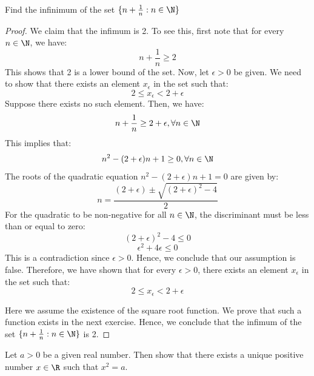 \documentclass[openany]{book}
\begin{document}
\begin{exercise}
Find the infinimum of the set $\{n + \frac{1}{n} : n \in \N\}$
\end{exercise}
\begin{proof}
We claim that the infimum is 2. To see this, first note that for every $n \in \N$, we have:
$$n + \frac{1}{n} \geq 2$$
This shows that 2 is a lower bound of the set. Now, let $\epsilon > 0$ be given. We need to show that there exists an element $x_\epsilon$ in the set such that:
$$2 \leq x_\epsilon < 2 + \epsilon$$
Suppose there exists no such element. Then, we have:
$$n + \frac{1}{n} \geq 2 + \epsilon, \forall n \in \N$$
This implies that:
$$n^2 - (2 + \epsilon)n + 1 \geq 0, \forall n \in \N$$
The roots of the quadratic equation $n^2 - (2 + \epsilon)n + 1 = 0$ are given by:
$$n = \frac{(2 + \epsilon) \pm \sqrt{(2 + \epsilon)^2 - 4}}{2}$$
For the quadratic to be non-negative for all $n \in \N$, the discriminant must be less than or equal to zero:
$$(2 + \epsilon)^2 - 4 \leq 0$$
$$\epsilon^2 + 4\epsilon \leq 0$$
This is a contradiction since $\epsilon > 0$. Hence, we conclude that our assumption is false. Therefore, we have shown that for every $\epsilon > 0$, there exists an element $x_\epsilon$ in the set such that:
$$2 \leq x_\epsilon < 2 + \epsilon$$

Here we assume the existence of the square root function. We prove that such a function exists in the next exercise. Hence, we conclude that the infimum of the set $\{n + \frac{1}{n} : n \in \N\}$ is 2.
\end{proof}
\begin{exercise}
    Let $a >0$ be a given real number. Then show that there exists a unique positive number $x \in \R$ such that $x^2 = a$.
\end{exercise}
\end{document}
